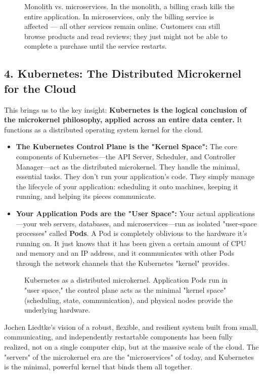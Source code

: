 \begin{figure}[htbp]
\centering

\caption{Monolith vs. microservices. In the monolith, a billing crash kills the entire application. In microservices, only the billing service is affected --- all other services remain online. Customers can still browse products and read reviews; they just might not be able to complete a purchase until the service restarts.}
\label{fig:2_2}
\end{figure}



\subsection{4. Kubernetes: The Distributed Microkernel for the Cloud}


This brings us to the key insight: \textbf{Kubernetes is the logical conclusion of the microkernel philosophy, applied across an entire data center.} It functions as a distributed operating system kernel for the cloud.

\begin{itemize}
\item \textbf{The Kubernetes Control Plane is the "Kernel Space":} The core components of Kubernetes---the API Server, Scheduler, and Controller Manager---act as the distributed microkernel. They handle the minimal, essential tasks. They don't run your application's code. They simply manage the lifecycle of your application: scheduling it onto machines, keeping it running, and helping its pieces communicate.
\item \textbf{Your Application Pods are the "User Space":} Your actual applications---your web servers, databases, and microservices---run as isolated "user-space processes" called \textbf{Pods}. A Pod is completely oblivious to the hardware it's running on. It just knows that it has been given a certain amount of CPU and memory and an IP address, and it communicates with other Pods through the network channels that the Kubernetes "kernel" provides.
\end{itemize}
\begin{figure}[htbp]
\centering

\caption{Kubernetes as a distributed microkernel. Application Pods run in "user space," the control plane acts as the minimal "kernel space" (scheduling, state, communication), and physical nodes provide the underlying hardware.}
\label{fig:2_3}
\end{figure}



Jochen Liedtke's vision of a robust, flexible, and resilient system built from small, communicating, and independently restartable components has been fully realized, not on a single computer chip, but at the massive scale of the cloud. The "servers" of the microkernel era are the "microservices" of today, and Kubernetes is the minimal, powerful kernel that binds them all together.
